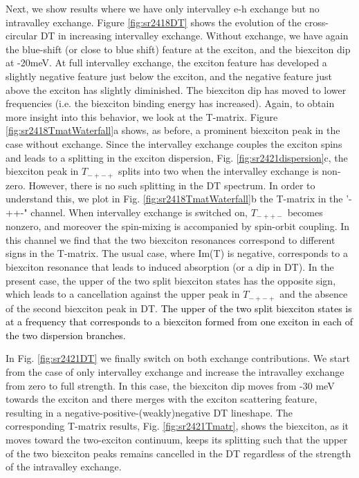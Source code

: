 \documentclass[aps,prb,superscriptaddress,letterpaper,amsmath,amssymb,twocolumn,preprintnumbers]{revtex4}
\newcommand\revisionA[1]{\textcolor{black}{#1}}
\begin{document}
 Next, we show results where we have only intervalley e-h exchange but no intravalley exchange. Figure \ref{fig:sr2418DT} shows the evolution of the cross-circular DT in increasing intervalley exchange. Without exchange, we have again the blue-shift (or close to blue shift) feature at the exciton, and the biexciton dip at -20meV. At full intervalley exchange, the exciton feature has developed a slightly negative feature just below the exciton, and the negative feature just above the exciton has slightly diminished. The biexciton dip has moved to lower frequencies (i.e. the biexciton binding energy has increased).
 Again, to obtain more insight into this behavior, we look at the T-matrix. Figure \ref{fig:sr2418TmatWaterfall}a
 shows, as before, a prominent biexciton peak in the case without exchange. Since the intervalley exchange couples the exciton spins and leads to a splitting in the exciton dispersion, Fig. \ref{fig:sr2421dispersion}c, the biexciton peak in $T_{-+-+}$ splits into two when the intervalley exchange is non-zero. However, there is no such splitting in the DT spectrum. In order to understand this, we plot in Fig. \ref{fig:sr2418TmatWaterfall}b the T-matrix in the '-++-" channel.
 When intervalley exchange is switched on, $T_{-++-}$ becomes nonzero, and moreover the spin-mixing is accompanied by spin-orbit coupling. In this channel we find that the two biexciton resonances correspond to different signs in the T-matrix. The usual case, where Im(T) is negative, corresponds to  a biexciton resonance that leads to induced absorption (or a dip in DT). In the present case, the upper of the two split biexciton states has the opposite sign, which leads to a cancellation
 against the upper peak in $T_{-+-+}$ and the absence of the second biexciton peak in DT.
\revisionA{The upper of the two split biexciton states is at a frequency that corresponds to a biexciton formed from one exciton in each of the two dispersion branches.
}


 In Fig. \ref{fig:sr2421DT} we finally switch on both exchange contributions. We start from the case of only intervalley exchange and increase the intravalley exchange from zero to full strength. In this case, the biexciton dip moves from -30 meV towards the exciton and there merges with the exciton scattering feature, resulting in a negative-positive-(weakly)negative DT lineshape. The corresponding T-matrix results, Fig. \ref{fig:sr2421Tmatr}, shows the biexciton, as it moves toward the two-exciton continuum, keeps its splitting such that the upper of the two biexciton peaks remains cancelled in the DT regardless of the strength of the intravalley exchange.
\end{document}
